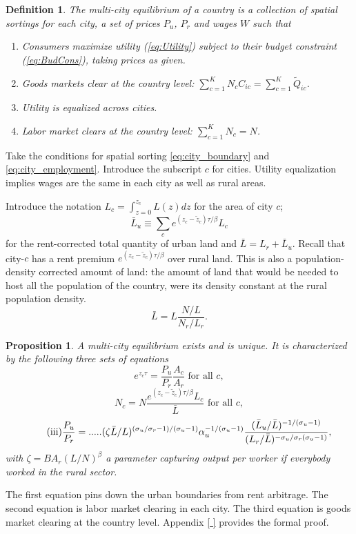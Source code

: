 \documentclass[12pt]{article}
\newtheorem{definition}{Definition}
\newtheorem{proposition}{Proposition}
\begin{document}
\begin{definition}
The multi-city equilibrium of a country is a collection of spatial sortings for each city, a set of prices $P_{u}$, $P_r$ and wages $W$ such that
\begin{enumerate}
    \item Consumers maximize utility (\ref{eq:Utility}) subject to their budget constraint (\ref{eq:BudCons}), taking prices as given.
    \item Goods markets clear at the country level: $\sum_{c=1}^K N_c C_{ic}=\sum_{c=1}^K\tilde Q_{ic}$.
	\item Utility is equalized across cities.
	\item Labor market clears at the country level: $\sum_{c=1}^K N_c = N$.
\end{enumerate}
\end{definition}
Take the conditions for spatial sorting \eqref{eq:city_boundary} and \eqref{eq:city_employment}.
Introduce the subscript $c$ for cities. Utility equalization implies wages are the same in each city as well as rural areas.

Introduce the notation $L_c = \int_{z=0}^{z_c}L(z)dz$ for the area of city $c$;
\[
\bar L_u \equiv 
	\sum_c e^{(z_c-\tilde z_c){\tau/\beta}}L_c
\]
for the rent-corrected total quantity of urban land and $\bar L = L_r + \bar L_u$. Recall that city-$c$ has a rent premium $e^{(z_c-\tilde z_c){\tau/\beta}}$ over rural land. This is also a population-density corrected amount of land: the amount of land that would be needed to host all the population of the country, were its density constant at the rural population density.
\[
\bar L = L
\frac{N/L}
	{N_r/L_r}.
\]

\begin{proposition}\label{prop:MCE}
A multi-city equilibrium exists and is unique. It is characterized by the following three sets of equations
\begin{equation}\tag{i}\label{eq:EQ1}
e^{z_{c} \tau} =
\frac{P_u}{P_r}
\frac {A_c}{A_r}\text{ for all }c,
\end{equation}
\begin{equation}\tag{ii}\label{eq:EQ2}
	N_c =  N
\frac {e^{(z_c-\tilde z_c){\tau/\beta}}L_c}
	{{\bar L}} \text{ for all }c,
\end{equation}
\begin{equation}\label{eq:EQ3}\tag{iii}
\frac {P_u}{P_r}
=.....
(\zeta \Bar L/L)^{(\sigma_u/\sigma_r-1)/(\sigma_u-1)}
\alpha_u^{-1/(\sigma_u-1)}
\frac {(\bar L_u/\bar L)^{-1/(\sigma_u-1)}}
{(L_r/\bar L)^{-\sigma_u/\sigma_r(\sigma_u-1)}},
\end{equation}
with $\zeta = B A_r (L/N)^{\beta}$ a parameter capturing output per worker if everybody worked in the rural sector.
\end{proposition}
The first equation pins down the urban boundaries from rent arbitrage. The second equation is labor market clearing in each city. The third equation is goods market clearing at the country level. Appendix \ref{
} provides the formal proof.
 
\end{document}
